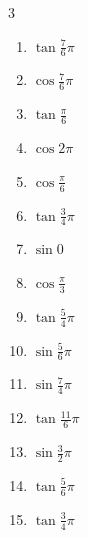\begin{multicols}{3}
\begin{enumerate}
  \item $\displaystyle \tan{\frac{7}{6}\pi}$

  \item $\displaystyle \cos{\frac{7}{6}\pi}$

  \item $\displaystyle \tan{\frac{\pi}{6}}$

  \item $\displaystyle \cos{2\pi}$
        \phantom{$\displaystyle =1$}

  \item $\displaystyle \cos{\frac{\pi}{6}}$

  \item $\displaystyle \tan{\frac{3}{4}\pi}$
        \phantom{$\displaystyle =-1$}

  \item $\displaystyle \sin{0}$
        \phantom{$\displaystyle =0$}

  \item $\displaystyle \cos{\frac{\pi}{3}}$

  \item $\displaystyle \tan{\frac{5}{4}\pi}$
        \phantom{$\displaystyle =1$}

  \item $\displaystyle \sin{\frac{5}{6}\pi}$

  \item $\displaystyle \sin{\frac{7}{4}\pi}$

\columnbreak %

\resetques

  \item $\displaystyle \tan{\frac{11}{6}\pi}$

  \item $\displaystyle \sin{\frac{3}{2}\pi}$
        \phantom{$\displaystyle =-1$}

  \item $\displaystyle \tan{\frac{5}{6}\pi}$

  \item $\displaystyle \tan{\frac{3}{4}\pi}$
        \phantom{$\displaystyle =-1$}


\end{enumerate}
\end{multicols}
